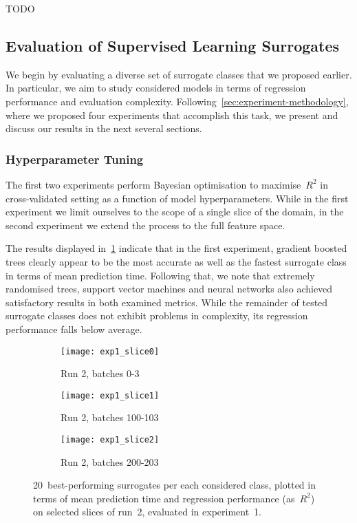 TODO

\subsection{Evaluation of Supervised Learning Surrogates}
\label{sec:modelres}

We begin by evaluating a diverse set of surrogate classes that we proposed
earlier. In particular, we aim to study considered models in terms of regression
performance and evaluation complexity.
Following~\cref{sec:experiment-methodology}, where we proposed four experiments
that accomplish this task, we present and discuss our results in the next
several sections.


\subsubsection{Hyperparameter Tuning}

The first two experiments perform Bayesian optimisation to maximise~$R^2$ in
cross-validated setting as a function of model hyperparameters. While in the
first experiment we limit ourselves to the scope of a single slice of the
domain, in the second experiment we extend the process to the full feature
space.

The results displayed in~\cref{fig:exp1-time-vs-reg} indicate that in the first
experiment, gradient boosted trees clearly appear to be the most accurate as
well as the fastest surrogate class in terms of mean prediction time. Following
that, we note that extremely randomised trees, support vector machines and
neural networks also achieved satisfactory results in both examined metrics.
While the remainder of tested surrogate classes does not exhibit problems in
complexity, its regression performance falls below average.

\begin{figure}[h]
	\centering
	\begin{subfigure}[b]{0.333\textwidth}
		\centering
		\texttt{[image: exp1\_slice0]}
		\caption{Run 2, batches 0-3}
	\end{subfigure}\hfill%
	\begin{subfigure}[b]{0.333\textwidth}
		\centering
		\texttt{[image: exp1\_slice1]}
		\caption{Run 2, batches 100-103}
	\end{subfigure}\hfill%
	\begin{subfigure}[b]{0.333\textwidth}
		\centering
		\texttt{[image: exp1\_slice2]}
		\caption{Run 2, batches 200-203}
	\end{subfigure}
	\caption{20~best-performing surrogates per each considered class, plotted in
	terms of mean prediction time and regression performance (as~$R^2$) on
	selected slices of run~2, evaluated in experiment~1.}
	\label{fig:exp1-time-vs-reg}
\end{figure}

